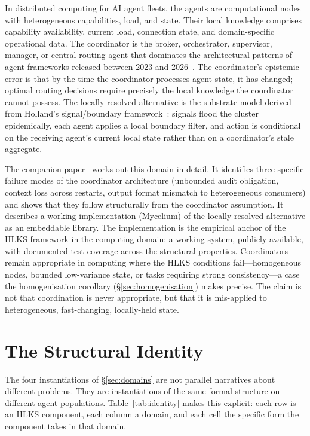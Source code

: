 \documentclass[11pt]{article}
\theoremstyle{definition}
\theoremstyle{plain}
\theoremstyle{plain}
\begin{document}
In distributed computing for AI agent fleets, the agents are computational
nodes with heterogeneous capabilities, load, and state. Their local knowledge
comprises capability availability, current load, connection state, and
domain-specific operational data. The coordinator is the broker,
orchestrator, supervisor, manager, or central routing agent that dominates
the architectural patterns of agent frameworks released between 2023 and
2026~\cite{nicholson2026}. The coordinator's epistemic error is that by the
time the coordinator processes agent state, it has changed; optimal routing
decisions require precisely the local knowledge the coordinator cannot
possess. The locally-resolved alternative is the substrate model derived from
Holland's signal/boundary framework~\cite{holland2012}: signals flood the
cluster epidemically, each agent applies a local boundary filter, and action
is conditional on the receiving agent's current local state rather than on a
coordinator's stale aggregate.

The companion paper~\cite{nicholson2026} works out this domain in detail. It
identifies three specific failure modes of the coordinator architecture
(unbounded audit obligation, context loss across restarts, output format
mismatch to heterogeneous consumers) and shows that they follow structurally
from the coordinator assumption. It describes a working implementation
(Mycelium) of the locally-resolved alternative as an embeddable library. The
implementation is the empirical anchor of the HLKS framework in the computing
domain: a working system, publicly available, with documented test coverage
across the structural properties. Coordinators remain appropriate in computing where
the HLKS conditions fail---homogeneous nodes, bounded low-variance state, or tasks
requiring strong consistency---a case the homogenisation corollary
(\S\ref{sec:homogenisation}) makes precise. The claim is not that coordination is
never appropriate, but that it is mis-applied to heterogeneous, fast-changing,
locally-held state.

\section{The Structural Identity}
\label{sec:identity}

The four instantiations of \S\ref{sec:domains} are not parallel narratives
about different problems. They are instantiations of the same formal structure
on different agent populations. Table~\ref{tab:identity} makes this explicit:
each row is an HLKS component, each column a domain, and each cell the
specific form the component takes in that domain.
\end{document}
